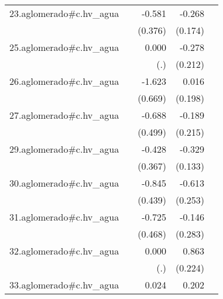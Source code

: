 {\begin{longtable}{l*{4}{D{.}{.}{-1}}}
\addlinespace
23.aglomerado#c.hv\_agua&                     &      -0.581         &      -0.268         &                     \\
            &                     &     (0.376)         &     (0.174)         &                     \\
\addlinespace
25.aglomerado#c.hv\_agua&                     &       0.000         &      -0.278         &                     \\
            &                     &         (.)         &     (0.212)         &                     \\
\addlinespace
26.aglomerado#c.hv\_agua&                     &      -1.623\sym{*}  &       0.016         &                     \\
            &                     &     (0.669)         &     (0.198)         &                     \\
\addlinespace
27.aglomerado#c.hv\_agua&                     &      -0.688         &      -0.189         &                     \\
            &                     &     (0.499)         &     (0.215)         &                     \\
\addlinespace
29.aglomerado#c.hv\_agua&                     &      -0.428         &      -0.329\sym{*}  &                     \\
            &                     &     (0.367)         &     (0.133)         &                     \\
\addlinespace
30.aglomerado#c.hv\_agua&                     &      -0.845         &      -0.613\sym{*}  &                     \\
            &                     &     (0.439)         &     (0.253)         &                     \\
\addlinespace
31.aglomerado#c.hv\_agua&                     &      -0.725         &      -0.146         &                     \\
            &                     &     (0.468)         &     (0.283)         &                     \\
\addlinespace
32.aglomerado#c.hv\_agua&                     &       0.000         &       0.863\sym{***}&                     \\
            &                     &         (.)         &     (0.224)         &                     \\
\addlinespace
33.aglomerado#c.hv\_agua&                     &       0.024         &       0.202\sym{**} &                     \\

\end{longtable}}
